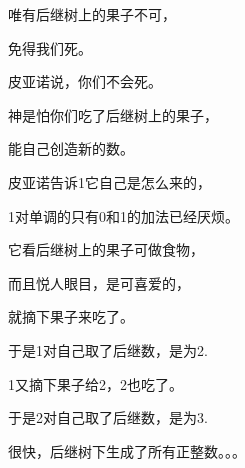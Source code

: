 \begin{centering}
唯有后继树上的果子不可，

免得我们死。

皮亚诺说，你们不会死。

神是怕你们吃了后继树上的果子，

能自己创造新的数。\vsp

皮亚诺告诉1它自己是怎么来的，

1对单调的只有0和1的加法已经厌烦。

它看后继树上的果子可做食物，

而且悦人眼目，是可喜爱的，

就摘下果子来吃了。\vsp

于是1对自己取了后继数，是为2.

1又摘下果子给2，2也吃了。

于是2对自己取了后继数，是为3.

很快，后继树下生成了所有正整数。。。

\end{centering}

